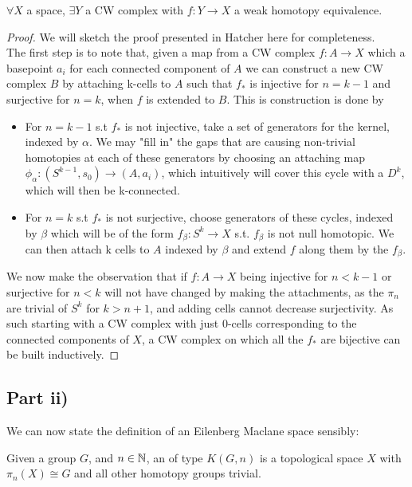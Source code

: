 \documentclass{article}
\begin{document}
\begin{theorem}[CW approximation]
$\forall X$ a space, $\exists Y$ a CW complex with $f:Y\to X$ a weak homotopy equivalence. 
\end{theorem}
\begin{proof}
We will sketch the proof presented in Hatcher here for completeness. \\
The first step is to note that, given a map from a CW complex $f:A\to X$ which a basepoint $a_i$ for each connected component of $A$ we can construct a new CW complex $B$ by attaching k-cells to $A$ such that $f_\ast$ is injective for $n=k-1$ and surjective for $n=k$, when $f$ is extended to $B$. This is construction is done by 
\begin{itemize}
    \item For $n=k-1$ s.t $f_\ast$ is not injective, take a set of generators for the kernel, indexed by $\alpha$. We may "fill in" the gaps that are causing non-trivial homotopies at each of these generators by choosing an attaching map $\phi_\alpha :(S^{k-1},s_0) \to (A,a_i)$, which intuitively will cover this cycle with a $D^k$, which will then be k-connected. 
    \item For $n = k$ s.t $f_\ast$ is not surjective, choose generators of these cycles, indexed by $\beta$ which will be of the form $f_\beta : S^k \to X$ s.t. $f_\beta$ is not null homotopic. We can then attach k cells to $A$ indexed by $\beta$ and extend $f$ along them by the $f_\beta$. 
\end{itemize}
We now make the observation that if $f: A \to X$ being injective for $n < k-1$ or surjective for $n < k$ will not have changed by making the attachments, as the $\pi_n$ are trivial of $S^k$ for $k > n+1$, and adding cells cannot decrease surjectivity. As such starting with a CW complex with just 0-cells corresponding to the connected components of $X$, a CW complex on which all the $f_\ast$ are bijective can be built inductively. 
\end{proof}

\subsection{Part ii)}
We can now state the definition of an Eilenberg Maclane space sensibly:

\begin{definition}
Given a group $G$, and $n\in\mathbb{N}$, an  of type $K(G,n)$ is a topological space $X$ with $\pi_n(X) \cong G$ and all other homotopy groups trivial. 
\end{definition}
\end{document}
